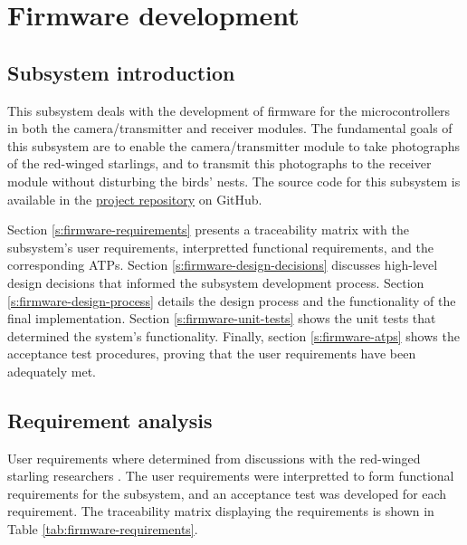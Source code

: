 \chapter{Firmware development \label{ch:firmware}}

\section{Subsystem introduction}

This subsystem deals with the development of firmware for the microcontrollers in both the camera/transmitter and receiver modules. The fundamental goals of this subsystem are to enable the camera/transmitter module to take photographs of the red-winged starlings, and to transmit this photographs to the receiver module without disturbing the birds' nests. The source code for this subsystem is available in the \href{https://github.com/rothdu/EEE4113F-Group13-2024}{project repository} on GitHub.

Section \ref{s:firmware-requirements} presents a traceability matrix with the subsystem's user requirements, interpretted functional requirements, and the corresponding ATPs. Section \ref{s:firmware-design-decisions} discusses high-level design decisions that informed the subsystem development process. Section \ref{s:firmware-design-process} details the design process and the functionality of the final implementation. Section \ref{s:firmware-unit-tests} shows the unit tests that determined the system's functionality. Finally, section \ref{s:firmware-atps} shows the acceptance test procedures, proving that the user requirements have been adequately met.

\section{Requirement analysis \label{s:firmware-requirements}}
User requirements where determined from discussions with the red-winged starling researchers \cite{hofmeyer2024private}. The user requirements were interpretted to form functional requirements for the subsystem, and an acceptance test was developed for each requirement. The traceability matrix displaying the requirements is shown in Table \ref{tab:firmware-requirements}.


